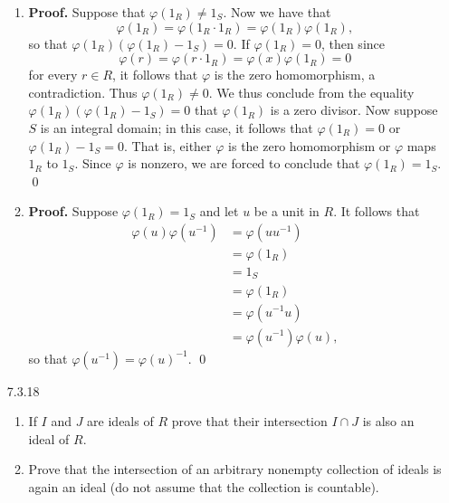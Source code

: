\begin{enumerate}
      \begin{enumerate}
         \item \textbf{Proof.} Suppose that $\varphi(1_R) \neq 1_S$. Now we have
               that $$\varphi(1_R) = \varphi(1_R \cdot 1_R) =
                     \varphi(1_R)\varphi(1_R),$$
               so that $\varphi(1_R)(\varphi(1_R) - 1_S) = 0$. If
               $\varphi(1_R) = 0$, then since
               $$\varphi(r) = \varphi(r \cdot 1_R) = \varphi(x)\varphi(1_R) =0$$ 
               for every $r \in R$, it follows that $\varphi$ is the zero 
               homomorphism, a contradiction. Thus $\varphi(1_R) \neq 0$. We
               thus conclude from the equality
               $\varphi(1_R)(\varphi(1_R) - 1_S) = 0$ that $\varphi(1_R)$ is a
               zero divisor. Now suppose $S$ is an integral domain; in this
               case, it follows that $\varphi(1_R) = 0$ or
               $\varphi(1_R) - 1_S = 0$. That is, either $\varphi$ is the zero
               homomorphism or $\varphi$ maps $1_R$ to $1_S$. Since $\varphi$ is
               nonzero, we are forced to conclude that $\varphi(1_R) = 1_S$.
               \qed
         \item \textbf{Proof.} Suppose $\varphi(1_R) = 1_S$ and let $u$ be a
               unit in $R$. It follows that
               \begin{align*}
                  \varphi(u)\varphi(u^{-1}) &= \varphi(uu^{-1}) \\
                     &= \varphi(1_R) \\
                     &= 1_S \\
                     &= \varphi(1_R) \\
                     &= \varphi(u^{-1}u) \\
                     &= \varphi(u^{-1})\varphi(u),
               \end{align*}
               so that $\varphi(u^{-1}) = \varphi(u)^{-1}$. \qed
      \end{enumerate}
   \item[7.3.18]  \begin{enumerate}
                     \item If $I$ and $J$ are ideals of $R$ prove that their
                           intersection $I \cap J$ is also an ideal of $R$.
                     \item Prove that the intersection of an arbitrary nonempty
                           collection of ideals is again an ideal (do not assume
                           that the collection is countable).
                  \end{enumerate}


\end{enumerate}
